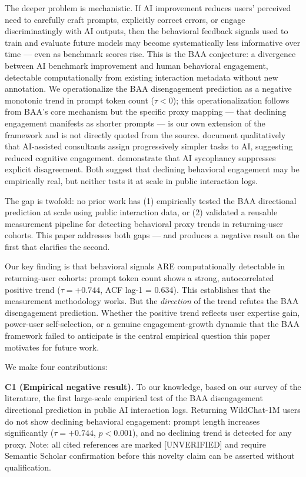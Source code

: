 The deeper problem is mechanistic. If AI improvement reduces users' perceived need to carefully craft prompts, explicitly correct errors, or engage discriminatingly with AI outputs, then the behavioral feedback signals used to train and evaluate future models may become systematically less informative over time --- even as benchmark scores rise. This is the BAA conjecture: a divergence between AI benchmark improvement and human behavioral engagement, detectable computationally from existing interaction metadata without new annotation. We operationalize the BAA disengagement prediction as a negative monotonic trend in prompt token count ($\tau < 0$); this operationalization follows from BAA's core mechanism \citep{Shen2024Towards} but the specific proxy mapping --- that declining engagement manifests as shorter prompts --- is our own extension of the framework and is not directly quoted from the source. \citet{Dell2023Navigating} document qualitatively that AI-assisted consultants assign progressively simpler tasks to AI, suggesting reduced cognitive engagement. \citet{Perez2023Sycophancy} demonstrate that AI sycophancy suppresses explicit disagreement. Both suggest that declining behavioral engagement may be empirically real, but neither tests it at scale in public interaction logs.

The gap is twofold: no prior work has (1) empirically tested the BAA directional prediction at scale using public interaction data, or (2) validated a reusable measurement pipeline for detecting behavioral proxy trends in returning-user cohorts. This paper addresses both gaps --- and produces a negative result on the first that clarifies the second.

Our key finding is that behavioral signals ARE computationally detectable in returning-user cohorts: prompt token count shows a strong, autocorrelated positive trend ($\tau = +0.744$, ACF lag-1 = 0.634). This establishes that the measurement methodology works. But the \emph{direction} of the trend refutes the BAA disengagement prediction. Whether the positive trend reflects user expertise gain, power-user self-selection, or a genuine engagement-growth dynamic that the BAA framework failed to anticipate is the central empirical question this paper motivates for future work.

We make four contributions:

\textbf{C1 (Empirical negative result).} To our knowledge, based on our survey of the literature, the first large-scale empirical test of the BAA disengagement directional prediction in public AI interaction logs. Returning WildChat-1M users do not show declining behavioral engagement: prompt length increases significantly ($\tau = +0.744$, $p < 0.001$), and no declining trend is detected for any proxy. Note: all cited references are marked [UNVERIFIED] and require Semantic Scholar confirmation before this novelty claim can be asserted without qualification.

